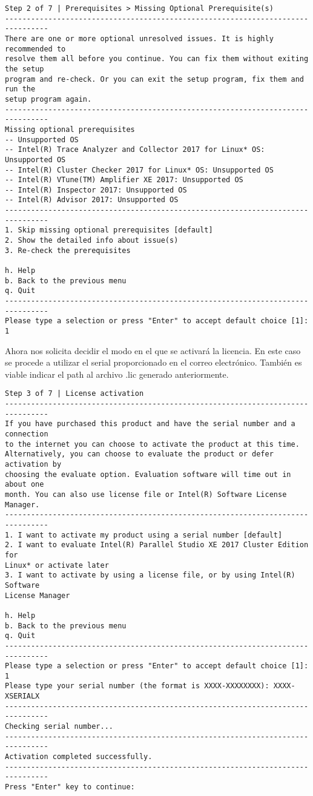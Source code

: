 \begin{lstlisting}
Step 2 of 7 | Prerequisites > Missing Optional Prerequisite(s)
--------------------------------------------------------------------------------
There are one or more optional unresolved issues. It is highly recommended to
resolve them all before you continue. You can fix them without exiting the setup
program and re-check. Or you can exit the setup program, fix them and run the
setup program again.
--------------------------------------------------------------------------------
Missing optional prerequisites
-- Unsupported OS
-- Intel(R) Trace Analyzer and Collector 2017 for Linux* OS: Unsupported OS
-- Intel(R) Cluster Checker 2017 for Linux* OS: Unsupported OS
-- Intel(R) VTune(TM) Amplifier XE 2017: Unsupported OS
-- Intel(R) Inspector 2017: Unsupported OS
-- Intel(R) Advisor 2017: Unsupported OS
--------------------------------------------------------------------------------
1. Skip missing optional prerequisites [default]
2. Show the detailed info about issue(s)
3. Re-check the prerequisites

h. Help
b. Back to the previous menu
q. Quit
--------------------------------------------------------------------------------
Please type a selection or press "Enter" to accept default choice [1]: 1

\end{lstlisting}

Ahora nos solicita decidir el modo en el que se activará la licencia. En este caso se procede a utilizar el serial proporcionado en el correo electrónico. También es viable indicar el path al archivo .lic generado anteriormente.

\begin{lstlisting}
Step 3 of 7 | License activation
--------------------------------------------------------------------------------
If you have purchased this product and have the serial number and a connection
to the internet you can choose to activate the product at this time.
Alternatively, you can choose to evaluate the product or defer activation by
choosing the evaluate option. Evaluation software will time out in about one
month. You can also use license file or Intel(R) Software License Manager.
--------------------------------------------------------------------------------
1. I want to activate my product using a serial number [default]
2. I want to evaluate Intel(R) Parallel Studio XE 2017 Cluster Edition for
Linux* or activate later 
3. I want to activate by using a license file, or by using Intel(R) Software
License Manager

h. Help
b. Back to the previous menu
q. Quit
--------------------------------------------------------------------------------
Please type a selection or press "Enter" to accept default choice [1]: 1
Please type your serial number (the format is XXXX-XXXXXXXX): XXXX-XSERIALX
--------------------------------------------------------------------------------
Checking serial number...
--------------------------------------------------------------------------------
Activation completed successfully.
--------------------------------------------------------------------------------
Press "Enter" key to continue: 
\end{lstlisting}


